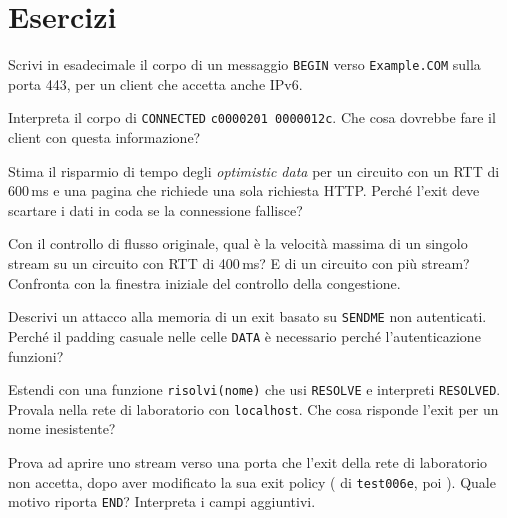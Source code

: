 \section*{Esercizi}

\begin{esercizio}[1]\label{es:11-begin}
Scrivi in esadecimale il corpo di un messaggio \texttt{BEGIN} verso \texttt{Example.COM} sulla porta 443, per un client che accetta anche IPv6.
\end{esercizio}

\begin{esercizio}[1]\label{es:11-connected}
Interpreta il corpo di \texttt{CONNECTED} \texttt{c0000201 0000012c}. Che cosa dovrebbe fare il client con questa informazione?
\end{esercizio}

\begin{esercizio}[1]\label{es:11-optimistic}
Stima il risparmio di tempo degli \emph{optimistic data} per un circuito con un RTT di 600\,ms e una pagina che richiede una sola richiesta HTTP. Perché l'exit deve scartare i dati in coda se la connessione fallisce?
\end{esercizio}

\begin{esercizio}[2]\label{es:11-velocita}
Con il controllo di flusso originale, qual è la velocità massima di un singolo stream su un circuito con RTT di 400\,ms? E di un circuito con più stream? Confronta con la finestra iniziale del controllo della congestione.
\end{esercizio}

\begin{esercizio}[2]\label{es:11-sendme-falso}
Descrivi un attacco alla memoria di un exit basato su \texttt{SENDME} non autenticati. Perché il padding casuale nelle celle \texttt{DATA} è necessario perché l'autenticazione funzioni?
\end{esercizio}

\begin{esercizio}[2]\label{es:11-resolve}
Estendi  con una funzione \texttt{risolvi(nome)} che usi \texttt{RESOLVE} e interpreti \texttt{RESOLVED}. Provala nella rete di laboratorio con \texttt{localhost}. Che cosa risponde l'exit per un nome inesistente?
\end{esercizio}

\begin{esercizio}[3]\label{es:11-policy}
Prova ad aprire uno stream verso una porta che l'exit della rete di laboratorio non accetta, dopo aver modificato la sua exit policy ( di \texttt{test006e}, poi ). Quale motivo riporta \texttt{END}? Interpreta i campi aggiuntivi.
\end{esercizio}

